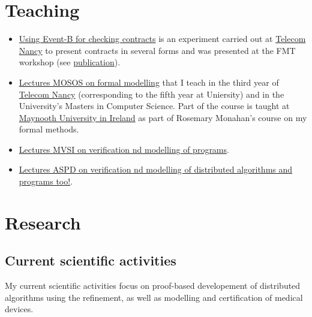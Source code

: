 \documentclass[ 12pt]{article}
\begin{document}
\section{Teaching}





\begin{itemize}

 
\item[] \href{https://mery54.github.io/fmt/}{Using Event-B  for
    checking contracts}   is an experiment carried out at \href{}{Telecom Nancy} to present contracts in several forms and was presented at the FMT workshop (see \href{https://link.springer.com/chapter/10.1007/978-3-031-71379-8_6}{publication}). 
  
\item[] \href{https://mery54.github.io/teaching/mosos/}{Lectures MOSOS 
    on formal modelling}  that I teach in the third year of
\href{https://telecomnancy.univ-lorraine.fr}{Telecom Nancy} (corresponding to the fifth year at Uniersity)
and in the University's Masters in Computer Science.  Part of the
course is taught at  \href{https://www.maynoothuniversity.ie/}{Maynooth University  in Ireland} as part of Rosemary Monahan's course on my formal methods.
  


  \item[] \href{https://mery54.github.io/teaching/mvsi/}{Lectures MVSI 
    on  verification  nd modelling of programs}.


  \item[] \href{https://mery54.github.io/teaching/aspd/}{Lectures ASPD
    on  verification  nd modelling of distributed algorithms  and
    programs too!}.


  
\end{itemize}

\section{Research}


\subsection{Current scientific activities}


  My current  scientific activities focus  on proof-based developement
  of distributed  algorithms  using    the refinement, as     well as
  modelling and certification of medical devices.
\end{document}
